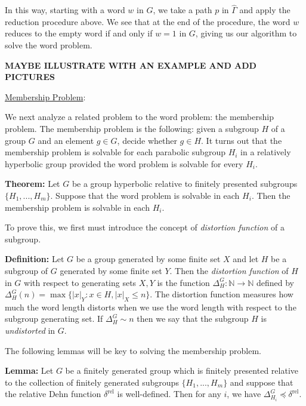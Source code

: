 \documentclass[12pt]{article}
\newcommand{\vs}{\vskip10pt}
\begin{document}
	\vs 
	
	In this way, starting with a word $w$ in $G$, we take a path $p$ in $\hat{\Gamma}$ and apply the reduction procedure above. We see that at the end of the procedure, the word $w$ reduces to the empty word if and only if $w = 1$ in $G$, giving us our algorithm to solve the word problem. 
	
	\textbf{MAYBE ILLUSTRATE WITH AN EXAMPLE AND ADD PICTURES}
	
	\vs 

	\underline{Membership Problem}: 
	
	\vs 
	
	We next analyze a related problem to the word problem: the membership problem. The membership problem is the following: given a subgroup $H$ of a group $G$ and an element $g \in G$, decide whether $g \in H$. It turns out that the membership problem is solvable for each parabolic subgroup $H_i$ in a relatively hyperbolic group provided the word problem is solvable for every $H_i$. 
	
	\vs
	
	\textbf{Theorem: } Let $G$ be a group hyperbolic relative to finitely presented subgroups $\{H_1,...,H_m\}$. Suppose that the word problem is solvable in each $H_i$. Then the membership problem is solvable in each $H_i$. 
	
	\vs 
	
	To prove this, we first must introduce the concept of \textit{distortion function} of a subgroup. 
	
	\vs
	
	\textbf{Definition: } Let $G$ be a group generated by some finite set $X$ and let $H$ be a subgroup of $G$ generated by some finite set $Y$. Then the \textit{distortion function} of $H$ in $G$ with respect to generating sets $X,Y$ is the function $\Delta_H^G : \mathbb{N} \rightarrow \mathbb{N} $ defined by $\Delta_H^G (n) = \max \{ \vert x \vert_Y : x \in H, \vert x \vert_X \leq n\}$. The distortion function measures how much the word length distorts when we use the word length with respect to the subgroup generating set. If $\Delta_H^G \sim n$ then we say that the subgroup $H$ is \textit{undistorted} in $G$. 
	
	\vs 
	
	The following lemmas will be key to solving the membership problem. 
	
	\vs 
	
	\textbf{Lemma: } Let $G$ be a finitely generated group which is finitely presented relative to the collection of finitely generated subgroups $\{H_1,...,H_m\}$ and suppose that the relative Dehn function $\delta^{\text{rel}}$ is well-defined.  Then for any $i$, we have $\Delta_{H_i}^G \preccurlyeq \delta^{\text{rel}}$. 
	
\end{document}
